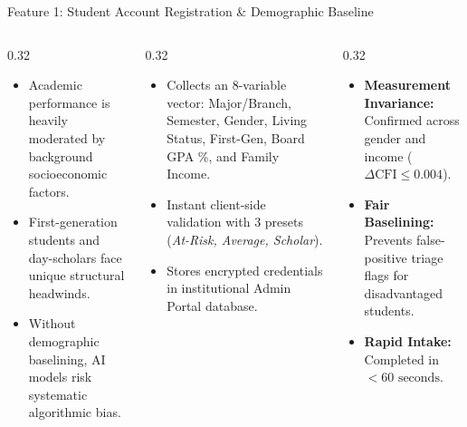 \documentclass[aspectratio=169,10pt]{beamer}
\newcommand{\whybox}[2]{
  \begin{tcolorbox}[colframe=whyframe,colbacktitle=whyframe,colback=whybg,title=\textbf{WHY? The Problem \& Need (#1)}]
  \scriptsize #2
  \end{tcolorbox}
}
\newcommand{\howbox}[2]{
  \begin{tcolorbox}[colframe=howframe,colbacktitle=howframe,colback=howbg,title=\textbf{HOW? The Technology \& Algorithms (#1)}]
  \scriptsize #2
  \end{tcolorbox}
}
\newcommand{\outbox}[2]{
  \begin{tcolorbox}[colframe=outframe,colbacktitle=outframe,colback=outbg,title=\textbf{OUTCOMES? Measurable Impact \& Results (#1)}]
  \scriptsize #2
  \end{tcolorbox}
}
\begin{document}
\begin{frame}{Feature 1: Student Account Registration \& Demographic Baseline}
\begin{columns}[T]
\begin{column}{0.32\textwidth}
\whybox{Contextual Baselining}{
\begin{itemize}
    \item Academic performance is heavily moderated by background socioeconomic factors.
    \item First-generation students and day-scholars face unique structural headwinds.
    \item Without demographic baselining, AI models risk systematic algorithmic bias.
\end{itemize}
}
\end{column}

\begin{column}{0.32\textwidth}
\howbox{Under the Hood}{
\begin{itemize}
    \item Collects an 8-variable vector: Major/Branch, Semester, Gender, Living Status, First-Gen, Board GPA \%, and Family Income.
    \item Instant client-side validation with 3 presets (\textit{At-Risk, Average, Scholar}).
    \item Stores encrypted credentials in institutional Admin Portal database.
\end{itemize}
}
\end{column}

\begin{column}{0.32\textwidth}
\outbox{Measurable Impact}{
\begin{itemize}
    \item \textbf{Measurement Invariance:} Confirmed across gender and income ($\Delta\text{CFI} \le 0.004$).
    \item \textbf{Fair Baselining:} Prevents false-positive triage flags for disadvantaged students.
    \item \textbf{Rapid Intake:} Completed in $<60\text{ seconds}$.
\end{itemize}
}
\end{column}
\end{columns}
\end{frame}
\end{document}
